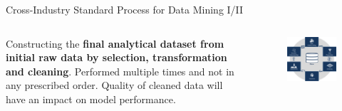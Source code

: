 \documentclass[main.tex]{subfiles}
\begin{document}
\begin{frame}{Cross-Industry Standard Process for Data Mining I/II}
\begin{columns}
\begin{column}{.6\textwidth}
\begin{justify}
                    Constructing the \textbf{final analytical dataset from initial raw data by selection, transformation and cleaning}. Performed multiple times and not in any prescribed order. Quality of cleaned data will have an impact on model performance.
                \end{justify}
            \end{column}
            \begin{column}{.4\textwidth}
                \begin{figure}
                    \label{fig:crisp-1}
                    \includegraphics[width=.9\textwidth]{figures/external/crisp.png}
                \end{figure}
            \end{column}
        \end{columns}
    \end{frame}
    
\end{document}
